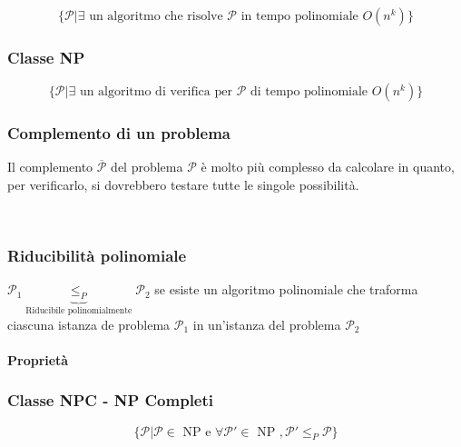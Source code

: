 \begin{equation}
\{\mathcal{P} | \exists \text{ un algoritmo che risolve } \mathcal{P} \text{ in tempo polinomiale } O(n^k)\}
\end{equation}



\subsubsection{Classe NP}

\begin{equation}
\{\mathcal{P} | \exists \text{ un algoritmo di verifica per } \mathcal{P} \text{ di tempo polinomiale } O(n^k) \}
\end{equation}



\subsubsection{Complemento di un problema}

Il complemento $\mathcal{\overline{P}}$ del problema $\mathcal{P}$ è molto più complesso da calcolare in quanto, per verificarlo, si dovrebbero testare tutte le singole possibilità.

\\



\subsubsection{Riducibilità polinomiale}

$\mathcal{P}_1 \underbrace{\leq_P}_\text{Riducibile polinomialmente} \mathcal{P}_2$ se esiste un algoritmo polinomiale che traforma ciascuna istanza de problema $\mathcal{P}_1$ in un'istanza del problema $\mathcal{P}_2$

\paragraph{Proprietà}


\subsubsection{Classe NPC - NP Completi}

\begin{equation}
\{\mathcal{P} | \mathcal{P} \in \text{ NP e } \forall \mathcal{P}' \in \text{ NP }, \mathcal{P}' \leq_P \mathcal{P} \}
\end{equation}

